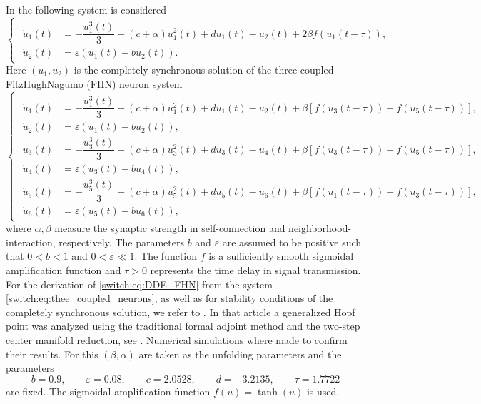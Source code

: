 In \cite{Xu2010} the following system is considered
\begin{equation}
\begin{cases}
\begin{aligned}
\dot{u}_{1}(t) & =-\dfrac{u^3_{1}(t)}{3}+(c+\alpha)u^2_{1}(t)+du_{1}(t)-u_{2}(t)+2\beta f(u_{1}(t-\tau)),\\
\dot{u}_{2}(t) & =\varepsilon(u_{1}(t)-bu_{2}(t)).
\end{aligned}
\end{cases}\label{switch:eq:DDE_FHN}
\end{equation}
Here $(u_{1},u_{2})$ is the completely synchronous solution of the three coupled FitzHugh\textendash Nagumo (FHN) neuron system
\begin{equation}
\begin{cases}
\begin{aligned}
\dot{u}_{1}(t) & =-\dfrac{u^{3}_{1}(t)}{3}+(c+\alpha)u_{1}^{2}(t)+du_{1}(t)-u_{2}(t)+\beta\left[f(u_{3}(t-\tau))+f(u_{5}(t-\tau))\right],\\
\dot{u}_{2}(t) & =\varepsilon(u_{1}(t)-bu_{2}(t)),\\
\dot{u}_{3}(t) & =-\dfrac{u^{3}_{3}(t)}{3}+(c+\alpha)u_{3}^{2}(t)+du_{3}(t)-u_{4}(t)+\beta\left[f(u_{3}(t-\tau))+f(u_{5}(t-\tau))\right],\\
\dot{u}_{4}(t) & =\varepsilon(u_{3}(t)-bu_{4}(t)),\\
\dot{u}_{5}(t) & =-\dfrac{u^{3}_{5}(t)}{3}+(c+\alpha)u_{5}^{2}(t)+du_{5}(t)-u_{6}(t)+\beta\left[f(u_{1}(t-\tau))+f(u_{3}(t-\tau))\right],\\
\dot{u}_{6}(t) & =\varepsilon(u_{5}(t)-bu_{6}(t)),
\end{aligned}
\end{cases}\label{switch:eq:thee_coupled_neurons}
\end{equation}
where $\alpha,\beta$ measure the synaptic strength in self-connection and neighborhood-interaction, respectively. The parameters $b$ and $\varepsilon$ are assumed to be positive such that $0<b<1$ and $0<\varepsilon\ll1$. The function $f$ is a sufficiently smooth sigmoidal amplification function and $\tau>0$ represents the time delay in signal transmission. For the derivation of \cref{switch:eq:DDE_FHN} from the system \cref{switch:eq:thee_coupled_neurons}, as well as for stability conditions of the completely synchronous solution, we refer to  \cite{Xu2010}. In that article a generalized Hopf point was analyzed using the traditional formal adjoint method and the two-step center manifold reduction, see \cite{Hale@1977}. Numerical simulations where made to confirm their results. For this $(\beta,\alpha)$ are taken as the unfolding parameters and the parameters
\[
b=0.9,\qquad\varepsilon=0.08,\qquad c=2.0528,\qquad d=-3.2135,\qquad\tau=1.7722
\]
are fixed. The sigmoidal amplification function $f(u)=\tanh(u)$ is used.

